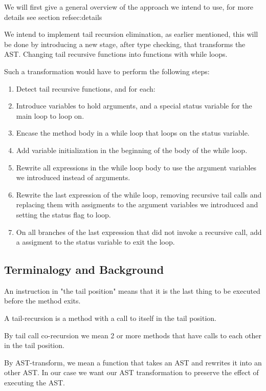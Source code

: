 \label{implementation}
We will first give a general overview of the approach we intend to use, for more details see section ref{sec:details}

We intend to implement tail recursion elimination, as earlier mentioned, this will be done by introducing a new stage, after type checking, that transforms the AST. Changing tail recursive functions into functions with while loops.

Such a transformation would have to perform the following steps:

\begin{enumerate}
    \item Detect tail recursive functions, and for each:
    \item Introduce variables to hold arguments, and a special status variable for the main loop to loop on.
    \item Encase the method body in a while loop that loops on the status variable.
    \item Add variable initialization in the beginning of the body of the while loop.
    \item Rewrite all expressions in the while loop body to use the argument variables we introduced instead of arguments. 
    \item Rewrite the last expression of the while loop, removing recursive tail calls and replacing them with assigments to the argument variables we introduced and setting the status flag to loop.
    \item On all branches of the last expression that did not invoke a recursive call, add a assigment to the status variable to exit the loop.
\end{enumerate}




\subsection{Terminalogy and Background}
An instruction in "the tail position" means that it is the last thing to be executed before the method exits.

A tail-recursion is a method with a call to itself in the tail position.

By tail call co-recursion we mean 2 or more methods that have calls to each other in the tail position.

By AST-transform, we mean a function that takes an AST and rewrites it into an other AST. In our case we want our AST transformation to preserve the effect of executing the AST.


